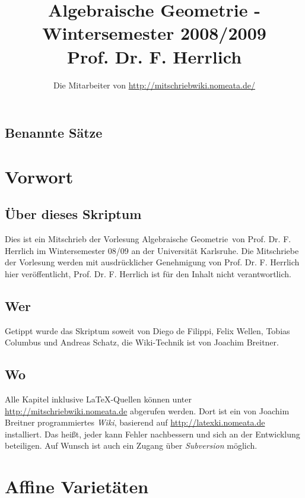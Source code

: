 \documentclass[a4paper,12pt]{report}
\title{Algebraische Geometrie - Wintersemester 2008/2009\\ Prof. Dr. F. Herrlich}
\author{Die Mitarbeiter von \url{http://mitschriebwiki.nomeata.de/}}
\theoremstyle{break}
\theoremstyle{nonumberbreak}
\theoremstyle{nonumberplain}
\begin{document}
\maketitle

\setlength\parskip{0.6pt}
\tableofcontents

\section*{Benannte Sätze}


\setlength\parskip{\smallskipamount}

\chapter{Vorwort}
\setcounter{secnumdepth}{2}
\section*{Über dieses Skriptum}
Dies ist ein Mitschrieb der Vorlesung \glqq Algebraische Geometrie\grqq\ von Prof. Dr. F. Herrlich im
Wintersemester 08/09 an der Universität Karlsruhe.
Die Mitschriebe der Vorlesung werden mit ausdrücklicher Genehmigung von Prof. Dr. F. Herrlich hier veröffentlicht,
Prof. Dr. F. Herrlich ist für  den Inhalt nicht verantwortlich.
\section*{Wer}
Getippt wurde das Skriptum soweit von Diego de Filippi, Felix Wellen, Tobias Columbus und Andreas Schatz, die Wiki-Technik ist von Joachim Breitner.

\section*{Wo}
Alle Kapitel inklusive \LaTeX-Quellen können unter \url{http://mitschriebwiki.nomeata.de} abgerufen werden.
Dort ist ein von Joachim Breitner programmiertes \emph{Wiki}, basierend auf \url{http://latexki.nomeata.de} installiert. 
Das heißt, jeder kann Fehler nachbessern und sich an der Entwicklung
beteiligen. Auf Wunsch ist auch ein Zugang über \emph{Subversion} möglich.


\chapter{Affine Varietäten}
\end{document}
